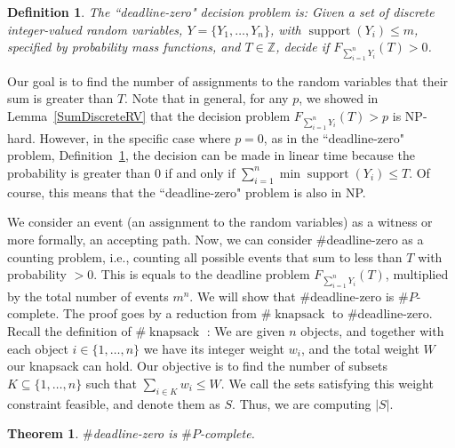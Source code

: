 \documentclass{article}
\newtheorem{theorem}{Theorem}
\newtheorem{definition}{Definition}
\DeclareMathOperator{\support}{support}
\begin{document}
	

\begin{definition}\label{Def:SDRVT}
	The ``deadline-zero" decision problem is: Given  a set of discrete integer-valued random variables, $Y=\{Y_1,\dots,Y_n\}$, with $\support(Y_i) \leq m$, specified by probability mass functions, and $T \in \mathbb{Z}$, decide if $F_{\sum_{i=1}^{n} Y_{i}} (T)>0$.
\end{definition}

Our goal is to find the number of assignments to the random variables that their sum is greater than $T$.
Note that in general, for any $p$, we showed in Lemma~\ref{SumDiscreteRV} that the decision problem $F_{\sum_{i=1}^{n} Y_{i}}(T)>p$ is NP-hard. However, in the specific case where $p=0$, as in the ``deadline-zero" problem,  Definition~\ref{Def:SDRVT}, the decision can be made in linear time because the probability is greater than $0$ if and only if  $\sum_{i=1}^{n} \min{\support(Y_{i})} \leq T$. Of course, this means that the ``deadline-zero" problem is also in NP. 

We consider an event (an assignment to the random variables) as a witness or more formally, an accepting path. Now, we can consider $\#$deadline-zero as a counting problem, i.e., counting all possible events that sum to less than $T$ with probability $>0$. This is equals to the deadline problem $F_{\sum_{i=1}^{n} Y_{i}}(T)$, multiplied by the total number of events $m^n$. We will show that $\#$deadline-zero is $\#P$-complete. The proof goes by a reduction from $\#\operatorname{knapsack}$ to $\#$deadline-zero. Recall the definition of $\#\operatorname{knapsack}$ \cite{arora2009computational}: We are given $n$ objects, and together with each object $i\in \{1,\dots , n\}$ we have its integer weight $w_i$, and the total weight $W$ our knapsack can hold. Our objective is to find the number of subsets $K \subseteq \{1, \dots , n\}$ such that $\sum_{i \in K} w_i \leq W$. We call the sets satisfying this weight constraint feasible, and denote them as $S$. Thus, we are computing $|S|$.

\begin{theorem} \label{deadlinSP}
$\#$deadline-zero is $\#P$-complete.
\end{theorem}
\end{document}
